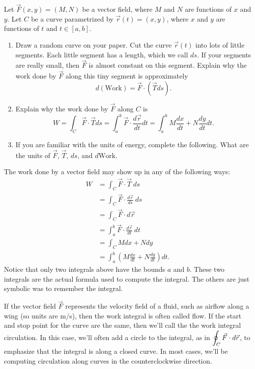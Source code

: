 \begin{problem}[Work]
%
 Let $\vec F(x,y)=(M,N)$ be a vector field, where $M$ and $N$ are functions of $x$ and $y$.   Let $C$ be a curve parametrized by $\vec r(t)=(x,y)$, where $x$ and $y$ are functions of $t$ and $t\in[a,b]$. 
\begin{enumerate}
 \item Draw a random curve on your paper.  Cut the curve $\vec r(t)$ into lots of little segments. Each little segment has a length, which we call $ds$. If your segments are really small, then $\vec F$ is almost constant on this segment.  Explain why the work done by $\vec F$ along this tiny segment is approximately $$d(\text{Work}) = \vec F\cdot (\vec T ds).$$
 \item Explain why the work done by $\vec F$ along $C$ is 
$$
W=\int_C \vec F\cdot \vec T ds 
= \int_a^b\vec F\cdot \frac{d\vec r}{dt}dt 
= \int_a^b M\frac{dx}{dt}+N\frac{dy}{dt} dt.
$$
 \item If you are familiar with the units of energy, complete the following. What are the units of $\vec F$,  $\vec T$, $ds$, and $d\text{Work}$.
\end{enumerate}
\end{problem}



The work done by a vector field may show up in any of the following ways: 
\begin{align*}
W
&=\int_C \vec F\cdot \vec T \ ds\\
&=\int_C \vec F\cdot \frac{d\vec r}{ds}\ ds \\
&= \int_C\vec F\cdot d\vec r \\
&=\int_a^b \vec F\cdot \frac{d\vec r}{dt}\ dt \\
&= \int_C Mdx+Ndy \\
&= \int_a^b \left( M\frac{dx}{dt}+N\frac{dy}{dt}\right) dt. 
\end{align*}
Notice that only two integrals above have the bounds $a$ and $b$.  These two integrals are the actual formula used to compute the integral. The others are just symbolic was to remember the integral.

\begin{definition}
If the vector field $\vec F$ represents the velocity field of a fluid, such as airflow along a wing (so units are m/s), then the work integral is often called flow.  If the start and stop point for the curve are the same, then we'll call the the work integral circulation. In this case, we'll often add a circle to the integral, as in $\displaystyle\oint_C \vec F\cdot d\vec r$, to emphasize that the integral is along a closed curve.  In most cases, we'll be computing circulation along curves in the counterclockwise direction.
\end{definition}

